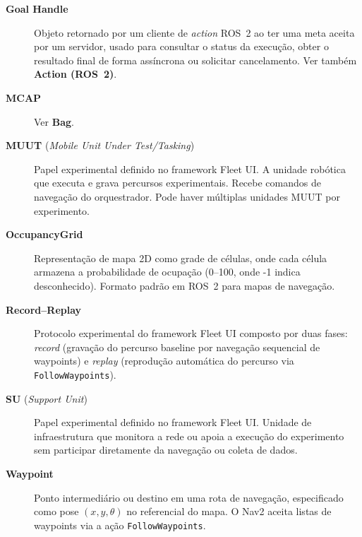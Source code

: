 \begin{description}
\item[\textbf{Goal Handle}]
Objeto retornado por um cliente de \textit{action} ROS~2 ao ter uma meta
aceita por um servidor, usado para consultar o status da execução, obter o
resultado final de forma assíncrona ou solicitar cancelamento. Ver também
\textbf{Action (ROS~2)}.

\item[\textbf{MCAP}]
Ver \textbf{Bag}.

\item[\textbf{MUUT} (\textit{Mobile Unit Under Test/Tasking})]
Papel experimental definido no framework Fleet UI. A unidade robótica que executa
e grava percursos experimentais. Recebe comandos de navegação do orquestrador.
Pode haver múltiplas unidades MUUT por experimento.

\item[\textbf{OccupancyGrid}]
Representação de mapa 2D como grade de células, onde cada célula armazena a
probabilidade de ocupação (0--100, onde -1 indica desconhecido). Formato padrão
em ROS~2 para mapas de navegação.

\item[\textbf{Record--Replay}]
Protocolo experimental do framework Fleet UI composto por duas fases:
\textit{record} (gravação do percurso baseline por navegação sequencial de waypoints)
e \textit{replay} (reprodução automática do percurso via \texttt{FollowWaypoints}).

\item[\textbf{SU} (\textit{Support Unit})]
Papel experimental definido no framework Fleet UI. Unidade de infraestrutura
que monitora a rede ou apoia a execução do experimento sem participar diretamente
da navegação ou coleta de dados.

\item[\textbf{Waypoint}]
Ponto intermediário ou destino em uma rota de navegação, especificado como pose
$(x, y, \theta)$ no referencial do mapa. O Nav2 aceita listas de waypoints via
a ação \texttt{FollowWaypoints}.

\end{description}
